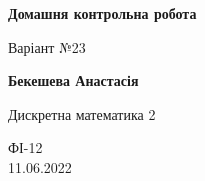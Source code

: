 \documentclass[a4paper,12pt]{article}
\begin{document}
\begin{titlepage}
    \begin{center}
        \vspace*{1cm}
            
        \Huge
        \textbf{Домашня контрольна робота}
            
        \vspace{0.5cm}
        \LARGE
        Варіант №23
            
        \vspace{1.5cm}
            
        \textbf{Бекешева Анастасія}
            
        \vfill
            
        Дискретна математика 2
            
        \vspace{0.8cm}
            

            
        \Large
        ФІ-12\\11.06.2022
            
    \end{center}
\end{titlepage}
\end{document}
